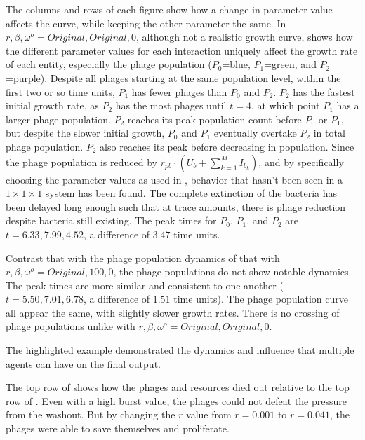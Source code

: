 The columns and rows of each figure show how a change in parameter value affects the curve, while keeping the other parameter the same. 
In $r, \beta, \omega^o=Original, Original, 0$, although not a realistic growth curve, shows how the different parameter values for each interaction uniquely affect the growth rate of each entity, especially the phage population ($P_0$=blue, $P_1$=green, and $P_2$=purple). 
Despite all phages starting at the same population level, within the first two or so time units, $P_1$ has fewer phages than $P_0$ and $P_2$. 
$P_2$ has the fastest initial growth rate, as $P_2$ has the most phages until $t=4$, at which point $P_1$ has a larger phage population. 
$P_2$ reaches its peak population count before $P_0$ or $P_1$, but despite the slower initial growth, $P_0$ and $P_1$ eventually overtake $P_2$ in total phage population. 
$P_2$ also reaches its peak before decreasing in population. 
Since the phage population is reduced by $r_{pb}\cdot(U_b + \sum_{k=1}^M I_{b_k})$, and by specifically choosing the parameter values as used in , behavior that hasn't been seen in a $1\times 1\times 1$ system has been found. 
The complete extinction of the bacteria has been delayed long enough such that at trace amounts, there is phage reduction despite bacteria still existing. 
The peak times for $P_0$, $P_1$, and $P_2$ are $t=6.33, 7.99, 4.52$, a difference of $3.47$ time units. 

Contrast that with the phage population dynamics of that with $r, \beta, \omega^o = Original, 100, 0$, the phage populations do not show notable dynamics. 
The peak times are more similar and consistent to one another ($t=5.50, 7.01, 6.78$, a difference of $1.51$ time units). 
The phage population curve all appear the same, with slightly slower growth rates. 
There is no crossing of phage populations unlike with $r, \beta, \omega^o=Original, Original, 0$. 

The highlighted example demonstrated the dynamics and influence that multiple agents can have on the final output. 

The top row of  shows how the phages and resources died out relative to the top row of . 
Even with a high burst value, the phages could not defeat the pressure from the washout. 
But by changing the $r$ value from $r=0.001$ to $r=0.041$, the phages were able to save themselves and proliferate. 

